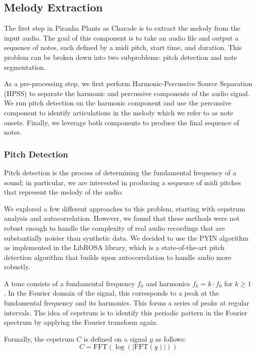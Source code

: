 \subsection{Melody Extraction}
\label{sec:melody_extraction}

The first step in Piranha Plants as Charade is to extract the melody from the input audio. The goal of this component is to take an audio file and output a sequence of notes, each defined by a midi pitch, start time, and duration. This problem can be broken down into two subproblems: pitch detection and note segmentation.

As a pre-processing step, we first perform Harmonic-Percussive Source Separation (HPSS) \autocite{HPSS:2010,HPSS:2014} to separate the harmonic and percussive components of the audio signal. We run pitch detection on the harmonic component and use the percussive component to identify articulations in the melody which we refer to as note onsets. Finally, we leverage both components to produce the final sequence of notes.

\subsubsection{Pitch Detection}

Pitch detection is the process of determining the fundamental frequency of a sound; in particular, we are interested in producing a sequence of midi pitches that represent the melody of the audio.

We explored a few different approaches to this problem, starting with cepstrum analysis and autocorrelation. However, we found that these methods were not robust enough to handle the complexity of real audio recordings that are substantially noisier than synthetic data. We decided to use the PYIN algorithm as implemented in the LibROSA library, which is a state-of-the-art pitch detection algorithm that builds upon autocorrelation to handle audio more robustly.


A tone consists of a fundamental frequency $f_0$ and harmonics $f_k = k \cdot f_0$ for $k \geq 1$. In the Fourier domain of the signal, this corresponds to a peak at the fundamental frequency and its harmonics. This forms a series of peaks at regular intervals. The idea of cepstrum is to identify this periodic pattern in the Fourier spectrum by applying the Fourier transform again.

Formally, the cepstrum $C$ is defined on a signal $y$ as follows:
$$C = \text{FFT}\left(\log\left(\left|\text{FFT}\left(y\right)\right|\right)\right)$$

